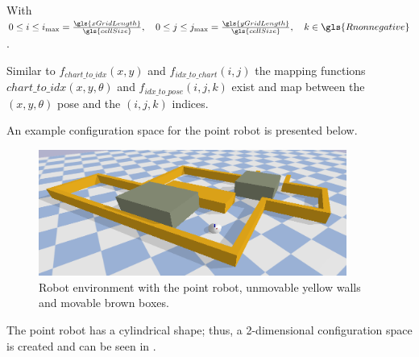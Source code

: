 With $0 \leq i \leq i_{\textrm{max}} = \frac{\gls{xGridLength}}{\gls{cellSize}}, \quad 0 \leq j \leq j_{\textrm{max}} = \frac{\gls{yGridLength}}{\gls{cellSize}}, \quad k \in \gls{Rnonnegative}$.\bs

Similar to $f_\mathit{chart\_to\_idx}(x, y)$ and $f_\mathit{idx\_to\_chart}(i,j)$ the mapping functions $\mathit{chart\_to\_idx}(x, y, \theta)$ and $f_\mathit{idx\_to\_pose}(i, j, k)$ exist and map between the $(x, y, \theta)$ pose and the $(i, j, k)$ indices.\bs

An example configuration space for the point robot is presented below.
\begin{figure}[H]
    \centering
    \includegraphics[width=0.9\textwidth]{figures/required_background/planning/two_push_to_freedom_env}
    \caption{Robot environment with the point robot, unmovable yellow walls and movable brown boxes.}%
    \label{fig:two_pushes_to_freedom_env}
\end{figure}

The point robot has a cylindrical shape; thus, a 2-dimensional configuration space is created and can be seen in .

